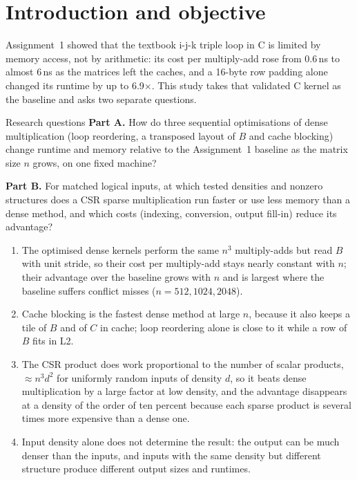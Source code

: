 \documentclass[11pt,a4paper]{article}
\newcommand{\concept}[1]{\par\addvspace{8pt}\Needspace{5\baselineskip}%
  \noindent{\color{accent}\bfseries\boldmath #1}\par\nopagebreak\vspace{2pt}}
\begin{document}
\section{Introduction and objective}

Assignment~1 showed that the textbook i-j-k triple loop in C is limited by memory access, not by
arithmetic: its cost per multiply-add rose from 0.6\,ns to almost 6\,ns as the matrices left the
caches, and a 16-byte row padding alone changed its runtime by up to 6.9$\times$. This study takes
that validated C kernel as the baseline and asks two separate questions.

\begin{titledbox}{Research questions}
\textbf{Part A.} How do three sequential optimisations of dense multiplication (loop reordering,
a transposed layout of $B$ and cache blocking) change runtime and memory relative to the
Assignment~1 baseline as the matrix size $n$ grows, on one fixed machine?

\textbf{Part B.} For matched logical inputs, at which tested densities and nonzero structures does
a CSR sparse multiplication run faster or use less memory than a dense method, and which costs
(indexing, conversion, output fill-in) reduce its advantage?
\end{titledbox}

\concept{Hypotheses (stated before measuring)}
\begin{enumerate}[label=\textbf{H\arabic*}, leftmargin=2.2em]
  \item The optimised dense kernels perform the same $n^3$ multiply-adds but read $B$ with unit
        stride, so their cost per multiply-add stays nearly constant with $n$; their advantage over
        the baseline grows with $n$ and is largest where the baseline suffers conflict misses
        ($n=512, 1024, 2048$).
  \item Cache blocking is the fastest dense method at large $n$, because it also keeps a tile of
        $B$ and of $C$ in cache; loop reordering alone is close to it while a row of $B$ fits in L2.
  \item The CSR product does work proportional to the number of scalar products,
        $\approx n^3d^2$ for uniformly random inputs of density $d$, so it beats dense
        multiplication by a large factor at low density, and the advantage disappears at a
        density of the order of ten percent because each sparse product is several times more
        expensive than a dense one.
  \item Input density alone does not determine the result: the output can be much denser than the
        inputs, and inputs with the same density but different structure produce different
        output sizes and runtimes.
\end{enumerate}
\end{document}
